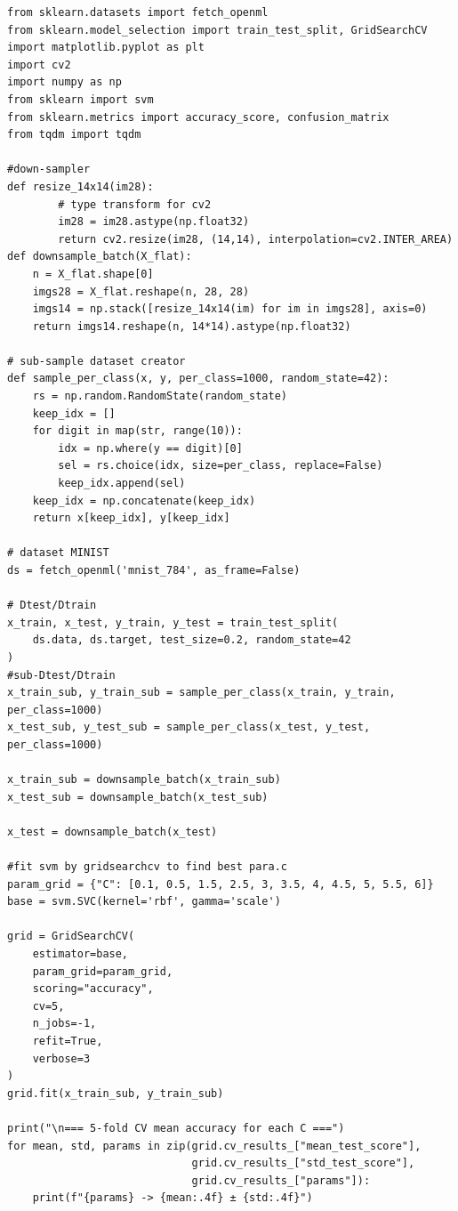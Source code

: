 \documentclass[11pt, reqno, letterpaper, twoside]{amsart}
\theoremstyle{plain}
\theoremstyle{definition}
\begin{document}
\begin{lstlisting}
from sklearn.datasets import fetch_openml
from sklearn.model_selection import train_test_split, GridSearchCV
import matplotlib.pyplot as plt
import cv2
import numpy as np
from sklearn import svm
from sklearn.metrics import accuracy_score, confusion_matrix
from tqdm import tqdm
  
#down-sampler
def resize_14x14(im28):
        # type transform for cv2
        im28 = im28.astype(np.float32)
        return cv2.resize(im28, (14,14), interpolation=cv2.INTER_AREA)
def downsample_batch(X_flat):
    n = X_flat.shape[0]
    imgs28 = X_flat.reshape(n, 28, 28)
    imgs14 = np.stack([resize_14x14(im) for im in imgs28], axis=0)
    return imgs14.reshape(n, 14*14).astype(np.float32)

# sub-sample dataset creator
def sample_per_class(x, y, per_class=1000, random_state=42):
    rs = np.random.RandomState(random_state)
    keep_idx = []
    for digit in map(str, range(10)):
        idx = np.where(y == digit)[0]
        sel = rs.choice(idx, size=per_class, replace=False)
        keep_idx.append(sel)
    keep_idx = np.concatenate(keep_idx)
    return x[keep_idx], y[keep_idx]

# dataset MINIST
ds = fetch_openml('mnist_784', as_frame=False)

# Dtest/Dtrain
x_train, x_test, y_train, y_test = train_test_split(
    ds.data, ds.target, test_size=0.2, random_state=42
)
#sub-Dtest/Dtrain
x_train_sub, y_train_sub = sample_per_class(x_train, y_train, per_class=1000)
x_test_sub, y_test_sub = sample_per_class(x_test, y_test, per_class=1000)

x_train_sub = downsample_batch(x_train_sub)   
x_test_sub = downsample_batch(x_test_sub) 

x_test = downsample_batch(x_test)

#fit svm by gridsearchcv to find best para.c
param_grid = {"C": [0.1, 0.5, 1.5, 2.5, 3, 3.5, 4, 4.5, 5, 5.5, 6]}  
base = svm.SVC(kernel='rbf', gamma='scale')

grid = GridSearchCV(
    estimator=base,
    param_grid=param_grid,
    scoring="accuracy",
    cv=5,       
    n_jobs=-1,
    refit=True,   
    verbose=3
)
grid.fit(x_train_sub, y_train_sub)

print("\n=== 5-fold CV mean accuracy for each C ===")
for mean, std, params in zip(grid.cv_results_["mean_test_score"],
                             grid.cv_results_["std_test_score"],
                             grid.cv_results_["params"]):
    print(f"{params} -> {mean:.4f} ± {std:.4f}")


\end{lstlisting}
\end{document}
